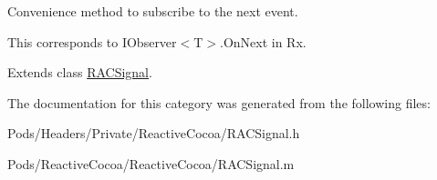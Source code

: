 Convenience method to subscribe to the {\ttfamily next} event.

This corresponds to {\ttfamily I\+Observer$<$T$>$.On\+Next} in Rx. 

Extends class \mbox{\hyperlink{interface_r_a_c_signal_a50d000f05e61411c438e616475deb7f8}{R\+A\+C\+Signal}}.



The documentation for this category was generated from the following files\+:\begin{DoxyCompactItemize}
\item 
Pods/\+Headers/\+Private/\+Reactive\+Cocoa/R\+A\+C\+Signal.\+h\item 
Pods/\+Reactive\+Cocoa/\+Reactive\+Cocoa/R\+A\+C\+Signal.\+m\end{DoxyCompactItemize}
